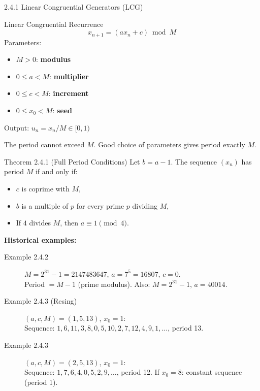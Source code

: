 \documentclass[aspectratio=169,10pt]{beamer}
\begin{document}
\begin{frame}[allowframebreaks]{2.4.1 Linear Congruential Generators (LCG)}

\begin{block}{Linear Congruential Recurrence}
\[
  x_{n+1} = (a x_n + c) \bmod M \tag{2.4.1}
\]
Parameters:
\begin{itemize}
  \item $M > 0$: \textbf{modulus}
  \item $0 \le a < M$: \textbf{multiplier}
  \item $0 \le c < M$: \textbf{increment}
  \item $0 \le x_0 < M$: \textbf{seed}
\end{itemize}
Output: $u_n = x_n / M \in [0,1)$
\end{block}

\medskip
The period cannot exceed $M$. Good choice of parameters gives period exactly $M$.

\framebreak

\begin{block}{Theorem 2.4.1 (Full Period Conditions)}
Let $b = a - 1$. The sequence $(x_n)$ has period $M$ if and only if:
\begin{itemize}
  \item $c$ is coprime with $M$,
  \item $b$ is a multiple of $p$ for every prime $p$ dividing $M$,
  \item If $4$ divides $M$, then $a \equiv 1 \pmod{4}$.
\end{itemize}
\end{block}

\medskip
\textbf{Historical examples:}

\begin{description}
  \item[Example 2.4.2] $M = 2^{31}-1 = 2147483647$, $a = 7^5 = 16807$, $c = 0$.\\
    Period $= M - 1$ (prime modulus). Also: $M = 2^{31}-1$, $a = 40014$.
  \item[Example 2.4.3 (Resing)] $(a,c,M) = (1,5,13)$, $x_0 = 1$:\\
    Sequence: $1, 6, 11, 3, 8, 0, 5, 10, 2, 7, 12, 4, 9, 1, \ldots$, period 13.
  \item[Example 2.4.3] $(a,c,M) = (2,5,13)$, $x_0 = 1$:\\
    Sequence: $1, 7, 6, 4, 0, 5, 2, 9, \ldots$, period 12.
    If $x_0 = 8$: constant sequence (period 1).
\end{description}


\end{frame}
\end{document}
